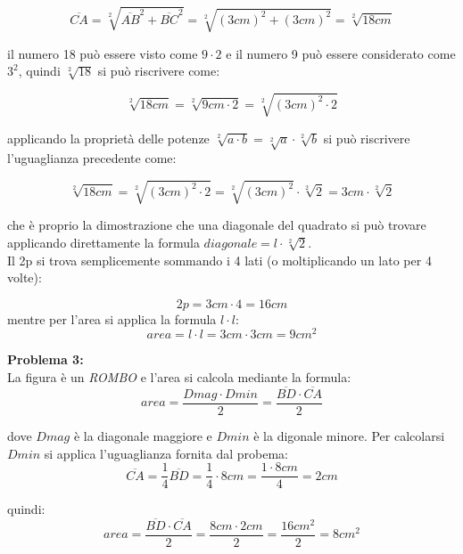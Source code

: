 \documentclass[14pt]{extarticle}
\begin{document}
\[\overline{CA}=\sqrt[2]{\overline{AB}^2+\overline{BC}^2}=\sqrt[2]{(3cm)^2+(3cm)^2}=\sqrt[2]{18cm}\]

il numero 18 può essere visto come \(9\cdot2\) e il numero 9 può essere considerato come \(3^2\), quindi \(\sqrt[2]{18}\) si può riscrivere come:

\[\sqrt[2]{18cm}=\sqrt[2]{9cm\cdot2}=\sqrt[2]{(3cm)^2\cdot2}\]

applicando la proprietà delle potenze \(\sqrt[2]{a\cdot b}=\sqrt[2]{a}\cdot\sqrt[2]{b}\) si può riscrivere l'uguaglianza precedente come:

\[\sqrt[2]{18cm}=\sqrt[2]{(3cm)^2\cdot2}=\sqrt[2]{(3cm)^2}\cdot\sqrt[2]{2}=3cm\cdot\sqrt[2]{2}\] 

che è proprio la dimostrazione che una diagonale del quadrato si può trovare applicando direttamente la formula \(diagonale=l\cdot\sqrt[2]{2}\).\\
Il 2p si trova semplicemente sommando i 4 lati (o moltiplicando un lato per 4 volte):

\[2p=3cm\cdot4=16cm\]
mentre per l'area si applica la formula \(l\cdot l\):
\[area=l\cdot l=3cm\cdot 3cm=9cm^2\]

\textbf{Problema 3:}\\
La figura è un \textit{ROMBO} e l'area si calcola mediante la formula:
\[area=\dfrac{Dmag\cdot Dmin}{2}=\dfrac{\overline{BD}\cdot\overline{CA}}{2}\]

dove \(Dmag\) è la diagonale maggiore e \(Dmin\) è la digonale minore. Per calcolarsi \(Dmin\) si applica l'uguaglianza fornita dal probema:
\[\overline{CA}=\dfrac{1}{4}\overline{BD}=\dfrac{1}{4}\cdot{8cm}=\dfrac{1\cdot 8cm}{4}=2cm\]

quindi:
\[area=\dfrac{\overline{BD}\cdot\overline{CA}}{2}=\dfrac{8cm\cdot 2cm}{2}= \dfrac{16cm^2}{2}=8cm^2\]
\end{document}
